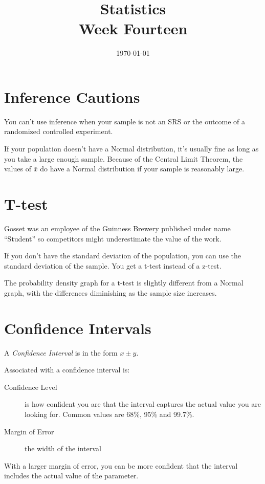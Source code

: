 \documentclass[landscape]{exam}
\title{Statistics \\ Week Fourteen}
\date{\today}
\author{}
\begin{document}
  \maketitle
  \tableofcontents

  \section{Inference Cautions}
  You can't use inference when your sample is not an SRS or the outcome of a
  randomized controlled experiment.

  If your population doesn't have a Normal distribution, it's usually fine as
  long as you take a large enough sample. Because of the Central Limit Theorem,
  the values of $\bar{x}$ do have a Normal distribution if your sample is
  reasonably large.

  \section{T-test}
  Gosset was an employee of the Guinness Brewery published under name
  ``Student'' so competitors might underestimate the value of the work.

  If you don't have the standard deviation of the population, you can use the
  standard deviation of the sample. You get a t-test instead of a z-test.

  The probability density graph for a t-test is slightly different from a Normal
  graph, with the differences diminishing as the sample size increases.

  \section{Confidence Intervals}
  A {\em Confidence Interval} is in the form $x \pm y$.

  Associated with a confidence interval is:
  \begin{description}
    \item[Confidence Level] is how confident you are that the interval
      captures the actual value you are looking for. Common values are 68\%,
      95\% and 99.7\%.

    \item[Margin of Error] the width of the interval
  \end{description}

  With a larger margin of error, you can be more confident that the interval
  includes the actual value of the parameter.
\end{document}
